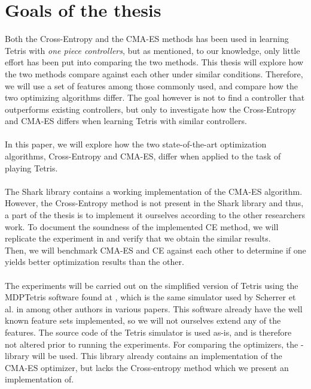 \section{Goals of the thesis}

Both the Cross-Entropy and the CMA-ES methods has been used 
in learning Tetris with \textit{one piece controllers}, but as 
mentioned, to our knowledge, only little effort has been put into 
comparing the two methods. This thesis will explore
how the two methods compare against each other under similar
conditions. Therefore, we will use a set of features among those
commonly used, and compare how the two optimizing algorithms 
differ. The goal however is not to find a controller that 
outperforms existing controllers, but only to investigate 
how the Cross-Entropy and CMA-ES differs when learning Tetris
with similar controllers.\\
\\
In this paper, we will explore how the two state-of-the-art
optimization algorithms, Cross-Entropy and CMA-ES, differ when 
applied to the task of playing Tetris.\\
\\
The Shark library \citep{shark08} contains a
working implementation of the CMA-ES 
algorithm. However, the Cross-Entropy method 
is not present in the Shark library and thus, 
a part of the thesis is to implement it ourselves according to 
the other researchers work. To document the 
soundness of the implemented CE method, 
we will replicate the experiment in \citep{thiery:09} and 
verify that we obtain the similar results.\\
Then, we will benchmark CMA-ES and CE against each other 
to determine if one yields better optimization results than the other.\\
\\
The experiments will be carried out on the simplified version of
Tetris using the MDPTetris software found at \citep{mdptetris},
which is the same simulator used by Scherrer et al. in \citep{scherrer2009:b} 
among other authors in various papers.
This software already have the well known feature sets
implemented, so we will not ourselves extend any of the features.
The source code of the Tetris simulator is used as-is, and is therefore 
not altered prior to running the experiments. 
For comparing the optimizers, the \shark -library will be used. 
This library already contains an
implementation of the CMA-ES optimizer, but lacks the 
Cross-entropy method which we present an implementation of.